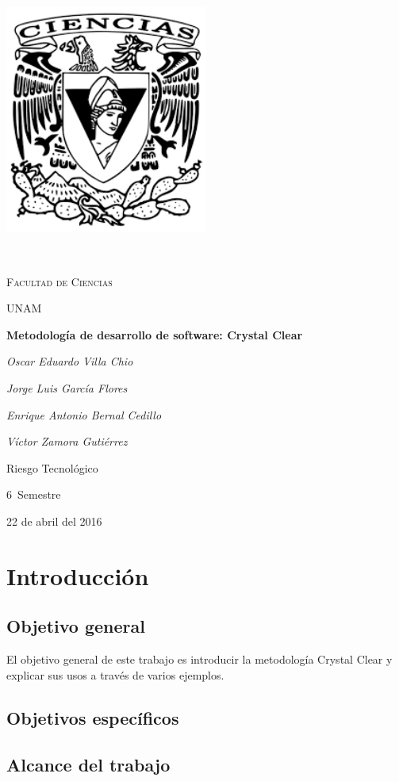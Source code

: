 \documentclass[12pt,a4paper]{article}
\begin{document}
\begin{titlepage}
	\centering
	\includegraphics[width=0.5\textwidth]{./images/logo_ciencias}\par\
	{\scshape\LARGE Facultad de Ciencias \par}
	{\scshape\LARGE UNAM \par}
	\vspace{1cm}
	{\huge\bfseries Metodolog\'ia de desarrollo de software: Crystal Clear\par}
	\vspace{2cm}
	{\Large\itshape Oscar Eduardo Villa Chio\par}
	{\Large\itshape Jorge Luis Garc\'ia Flores\par}
	{\Large\itshape Enrique Antonio Bernal Cedillo\par}
	{\Large\itshape V\'ictor Zamora Guti\'errez\par}
	\vspace{0.5cm}
	{\large Riesgo Tecnol\'ogico\par 6\textdegree \ Semestre\par}
	{\large 22 de abril del 2016}
\end{titlepage}
\section{Introducci\'on}
\subsection{Objetivo general}
El objetivo general de este trabajo es introducir la metodolog\'ia Crystal Clear y explicar sus usos a trav\'es de varios ejemplos.
\subsection{Objetivos espec\'ificos}
\subsection{Alcance del trabajo}
\end{document}
